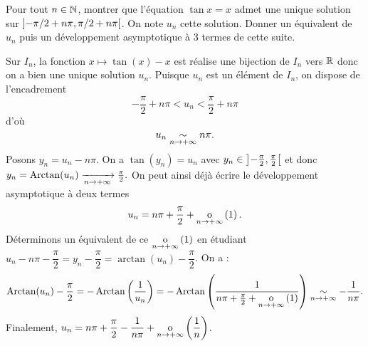 \documentclass{magnolia}
\begin{document}
\begin{exoUnique}
  \exo Pour tout $n\in\mathbb{N}$, montrer que l'équation $\tan x=x$ admet une unique
    solution sur $\left]-\pi/2+n\pi,\pi/2+n\pi\right[$. On note $u_n$ cette solution.
    Donner un équivalent de $u_n$ puis un développement asymptotique à 3 termes
    de cette suite.
    \begin{sol}
    Sur $I_n$, la fonction $x\mapsto \tan(x)-x$ est réalise une bijection de $I_n$ vers $\mathbb{R}$ donc on a bien une unique solution $u_n$.
    Puisque $u_n$ est un élément de $I_n$, on dispose de l'encadrement $$-\frac{\pi}{2}+n\pi < u_n < \frac{\pi}{2}+n\pi$$ d'où $$u_n\underset{n\rightarrow +\infty}{\sim}n\pi.$$
    Posons $y_n=u_n-n\pi$. On a $\tan(y_n)=u_n$ avec $y_n \in \left]-\frac{\pi}{2},\frac{\pi}{2}\right[$ et donc $y_n=\operatorname{Arctan}(u_n)\xrightarrow[n\rightarrow +\infty]{}\frac{\pi}{2}.$ On peut ainsi déjà écrire le développement asymptotique à deux termes $$u_n=n\pi +\frac{\pi}{2}+\underset{n \rightarrow +\infty}{\text{o}}\left(1\right).$$ Déterminons un équivalent de ce $\underset{n \rightarrow +\infty}{\text{o}}\left(1\right)$ en étudiant $u_n-n\pi-\dfrac{\pi}{2}=y_n-\dfrac{\pi}{2}=\arctan(u_n)-\dfrac{\pi}{2}$. On a :
    $$\operatorname{Arctan}(u_n)-\frac{\pi}{2}=-\operatorname{Arctan}\left(\frac{1}{u_n}\right)=-\operatorname{Arctan}\left(\frac{1}{n\pi +\frac{\pi}{2}+\underset{n \rightarrow +\infty}{\text{o}}\left(1\right)}\right)\underset{n\rightarrow +\infty}{\sim}-\frac{1}{n\pi}.$$
    Finalement, $u_n=n\pi+\dfrac{\pi}{2}-\dfrac{1}{n\pi}+\underset{n \rightarrow +\infty}{\text{o}}\left(\dfrac{1}{n}\right)$.
    \end{sol}
  \end{exoUnique}




\end{document}
